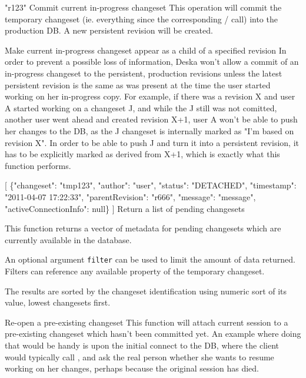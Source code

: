 \documentclass{article}
\begin{document}
    {"r123"}
    {Commit current in-progress changeset}
    {This operation will commit the temporary changeset (ie. everything since the corresponding
    / call) into the production DB.  A new persistent
    revision will be created.}

    {}
    {Make current in-progress changeset appear as a child of a specified revision}
    {In order to prevent a possible loss of information, Deska won't allow a commit of an in-progress changeset to the
    persistent, production revisions unless the latest persistent revision is the same as was present at the time the
    user started working on her in-progress copy. For example, if there was a revision X and user A started working on a
    changeset J, and while the J still was not comitted, another user went ahead and created revision X+1, user A won't
    be able to push her changes to the DB, as the J changeset is internally marked as "I'm based on revision X". In
    order to be able to push J and turn it into a persistent revision, it has to be explicitly marked as derived from
    X+1, which is exactly what this function performs.}

    {[
     \{"changeset": "tmp123", "author": "user", "status": "DETACHED", "timestamp": "2011-04-07 17:22:33",
     "parentRevision": "r666", "message": "message", \\ "activeConnectionInfo": null\}
    ]}
    {Return a list of pending changesets}
    {This function returns a vector of metadata for pending changesets which are currently available in the
    database.

    An optional argument {\tt filter} can be used to limit the amount of data returned.  Filters can reference any
    available property of the temporary changeset.

    The results are sorted by the changeset identification using numeric sort of its value, lowest changesets first.}

    {}
    {Re-open a pre-existing changeset}
    {This function will attach current session to a pre-existing changeset which hasn't been committed yet. An example
    where doing that would be handy is upon the initial connect to the DB, where the client would typically call
    , and ask the real person whether she wants to resume working on her changes,
    perhaps because the original session has died.}
\end{document}
